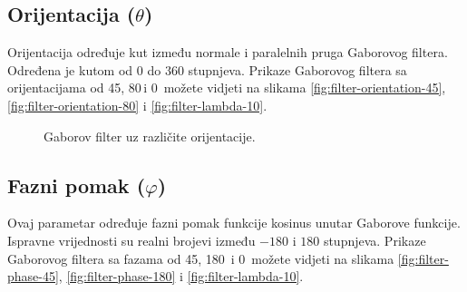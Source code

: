 \documentclass{article}
\begin{document}
\subsection{Orijentacija ($\theta$)}
Orijentacija određuje kut između normale i paralelnih pruga Gaborovog
filtera.
Određena je kutom od $0$ do $360$ stupnjeva. Prikaze Gaborovog filtera sa
orijentacijama od 45\textdegree, 80\textdegree\,i 0\textdegree\, možete vidjeti
na slikama \ref{fig:filter-orientation-45}, \ref{fig:filter-orientation-80} i
\ref{fig:filter-lambda-10}.

\begin{figure}[htb]
  \centering
  \hspace{50pt}
  \caption{Gaborov filter uz različite orijentacije.}
  \label{fig:filter-orientations}
\end{figure}

\subsection{Fazni pomak ($\varphi$)}
Ovaj parametar određuje fazni pomak funkcije kosinus unutar Gaborove funkcije.
Ispravne vrijednosti su realni brojevi između $-180$ i $180$ stupnjeva. Prikaze
Gaborovog filtera sa fazama od 45\textdegree, 180\textdegree\, i 0\textdegree\,
možete vidjeti na slikama \ref{fig:filter-phase-45},
\ref{fig:filter-phase-180} i \ref{fig:filter-lambda-10}.
\end{document}
